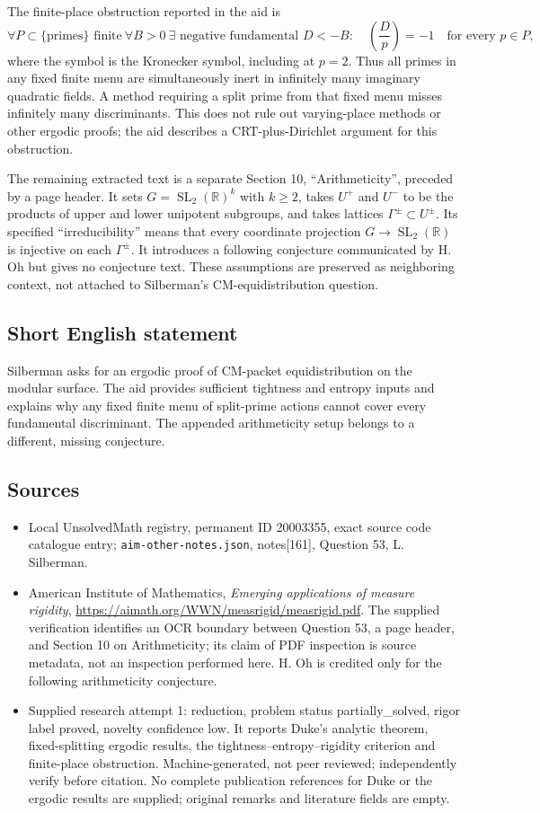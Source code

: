 \documentclass[11pt]{article}
\newcommand{\R}{\mathbb{R}}
\begin{document}
The finite-place obstruction reported in the aid is
\[
 \forall P\subset\{\text{primes}\}\text{ finite}\ \forall B>0\ 
 \exists\text{ negative fundamental }D<-B:\quad
 \left(\frac Dp\right)=-1\quad\text{for every }p\in P,
\]
where the symbol is the Kronecker symbol, including at $p=2$. Thus all primes in any fixed finite menu are simultaneously inert in infinitely many imaginary quadratic fields. A method requiring a split prime from that fixed menu misses infinitely many discriminants. This does not rule out varying-place methods or other ergodic proofs; the aid describes a CRT-plus-Dirichlet argument for this obstruction.

The remaining extracted text is a separate Section 10, ``Arithmeticity'', preceded by a page header. It sets $G=\operatorname{SL}_2(\R)^k$ with $k\geq2$, takes $U^+$ and $U^-$ to be the products of upper and lower unipotent subgroups, and takes lattices $\Gamma^\pm\subset U^\pm$. Its specified ``irreducibility'' means that every coordinate projection $G\to\operatorname{SL}_2(\R)$ is injective on each $\Gamma^\pm$. It introduces a following conjecture communicated by H. Oh but gives no conjecture text. These assumptions are preserved as neighboring context, not attached to Silberman's CM-equidistribution question.
\subsection{Short English statement}
Silberman asks for an ergodic proof of CM-packet equidistribution on the modular surface. The aid provides sufficient tightness and entropy inputs and explains why any fixed finite menu of split-prime actions cannot cover every fundamental discriminant. The appended arithmeticity setup belongs to a different, missing conjecture.
\subsection{Sources}
\begin{itemize}
\item Local UnsolvedMath registry, permanent ID 20003355, exact source code catalogue entry; \texttt{aim-other-notes.json}, notes[161], Question 53, L. Silberman.
\item American Institute of Mathematics, \emph{Emerging applications of measure rigidity}, \url{https://aimath.org/WWN/measrigid/measrigid.pdf}. The supplied verification identifies an OCR boundary between Question 53, a page header, and Section 10 on Arithmeticity; its claim of PDF inspection is source metadata, not an inspection performed here. H. Oh is credited only for the following arithmeticity conjecture.
\item Supplied research attempt 1: reduction, problem status partially\_solved, rigor label proved, novelty confidence low. It reports Duke's analytic theorem, fixed-splitting ergodic results, the tightness--entropy--rigidity criterion and finite-place obstruction. Machine-generated, not peer reviewed; independently verify before citation. No complete publication references for Duke or the ergodic results are supplied; original remarks and literature fields are empty.
\end{itemize}
\end{document}
